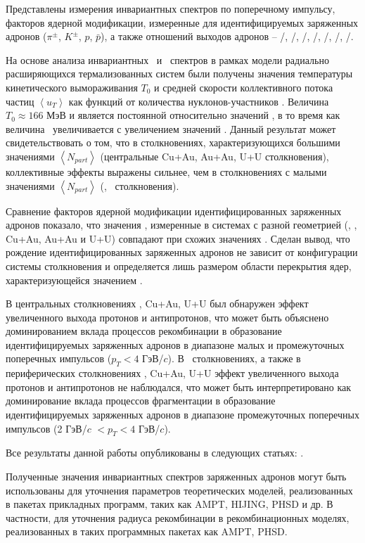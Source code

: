 Представлены измерения инвариантных спектров по поперечному импульсу, факторов ядерной модификации, измеренные для идентифицируемых заряженных адронов ($\pi^\pm$, $K^\pm$, $p$, $\bar{p}$), а также отношений выходов адронов -- \pim/\pip, \Km/\Kp, \prot/\aprot, \prot/\pip, \aprot/\pim, \Kp/\pip, \Km/\pim.

На основе анализа инвариантных \pt \ и \mt \ спектров в рамках модели радиально расширяющихся термализованных систем были получены значения температуры кинетического вымораживания $T_{0}$ и средней скорости коллективного потока частиц $\left< u_T \right>$ как функций от количества нуклонов-участников \Npart.
Величина $T_{0}\approx166$ МэВ и является постоянной относительно значений \Npart, в то время как величина \ut \ увеличивается с увеличением значений \Npart. 
Данный результат может свидетельствовать о том, что в столкновениях, характеризующихся большими значениями $\left<N_{part}\right>$ (центральные Cu+Au, Au+Au, U+U столкновения), коллективные эффекты выражены сильнее, чем в столкновениях с малыми значениями $\left<N_{part}\right>$ (\pal, \heau \ столкновения).

Сравнение факторов ядерной модификации идентифицированных заряженных адронов показало, что значения \rab, измеренные в системах с разной геометрией (\dau, \heau, Cu+Au, Au+Au и U+U) совпадают при схожих значениях \Npart.
Сделан вывод, что рождение идентифицированных заряженных адронов не зависит от конфигурации системы столкновения и определяется лишь размером области перекрытия ядер, характеризующейся значением \Npart.

В центральных столкновениях \heau, Cu+Au, U+U был обнаружен эффект увеличенного выхода протонов и антипротонов, что может быть объяснено доминированием вклада процессов рекомбинации в образование идентифицируемых заряженных адронов в диапазоне малых и промежуточных поперечных импульсов ($p_{T}<4$ ГэВ/$c$). 
В \pal \ столкновениях, а также в периферических столкновениях \heau, Cu+Au, U+U эффект увеличенного выхода протонов и антипротонов не наблюдался, что может быть интерпретировано как доминирование вклада процессов фрагментации в образование идентифицируемых заряженных адронов в диапазоне промежуточных поперечных импульсов (2 ГэВ/$c$ $<p_{T}<4$ ГэВ/$c$).  

Все результаты данной работы опубликованы в следующих статьях: \autocite{PPG249, physica2020, physica2021, icppa2020, lomcon2021, nucleus2020, ICPPA2022, nucleus2021}.

Полученные значения инвариантных спектров заряженных адронов могут быть использованы для уточнения параметров теоретических моделей, реализованных в пакетах прикладных программ, таких как  AMPT, HIJING, PHSD и др. В частности, для уточнения радиуса рекомбинации в рекомбинационных моделях, реализованных в таких программных пакетах как AMPT, PHSD.